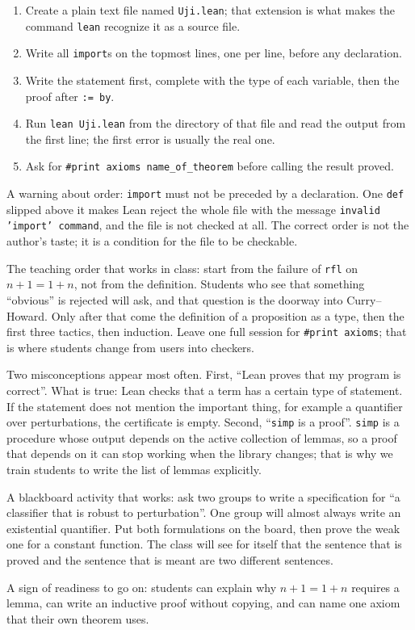 \begin{resep}
\begin{enumerate}
  \item Create a plain text file named \texttt{Uji.lean}; that extension is what makes the command
        \texttt{lean} recognize it as a source file.
  \item Write all \texttt{import}s on the topmost lines, one per line, before any declaration.
  \item Write the statement first, complete with the type of each variable, then the proof after
        \texttt{:= by}.
  \item Run \texttt{lean Uji.lean} from the directory of that file and read the output from the first
        line; the first error is usually the real one.
  \item Ask for \texttt{\#print axioms name\_of\_theorem} before calling the result proved.
\end{enumerate}
A warning about order: \texttt{import} must not be preceded by a declaration. One \texttt{def}
slipped above it makes Lean reject the whole file with the message
\texttt{invalid 'import' command}, and the file is not checked at all. The correct order is not the
author's taste; it is a condition for the file to be checkable.
\end{resep}

\begin{untukdosen}
The teaching order that works in class: start from the failure of \texttt{rfl} on $n+1=1+n$, not
from the definition. Students who see that something ``obvious'' is rejected will ask, and that
question is the doorway into Curry--Howard. Only after that come the definition of a proposition as a
type, then the first three tactics, then induction. Leave one full session for \texttt{\#print
axioms}; that is where students change from users into checkers.

Two misconceptions appear most often. First, ``Lean proves that my program is correct''. What is
true: Lean checks that a term has a certain type of statement. If the statement does not mention the
important thing, for example a quantifier over perturbations, the certificate is empty. Second,
``\texttt{simp} is a proof''. \texttt{simp} is a procedure whose output depends on the active
collection of lemmas, so a proof that depends on it can stop working when the library changes; that
is why we train students to write the list of lemmas explicitly.

A blackboard activity that works: ask two groups to write a specification for ``a classifier that is
robust to perturbation''. One group will almost always write an existential quantifier. Put both
formulations on the board, then prove the weak one for a constant function. The class will see for
itself that the sentence that is proved and the sentence that is meant are two different sentences.

A sign of readiness to go on: students can explain why $n+1=1+n$ requires a lemma, can write an
inductive proof without copying, and can name one axiom that their own theorem uses.
\end{untukdosen}

